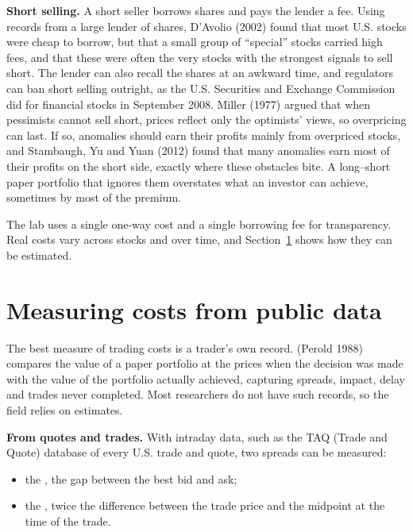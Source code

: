 \textbf{Short selling.} A short seller borrows shares and pays the lender a fee. Using records from a large lender of shares, D'Avolio (2002) found that most U.S. stocks were cheap to borrow, but that a small group of ``special'' stocks carried high fees, and that these were often the very stocks with the strongest signals to sell short. The lender can also recall the shares at an awkward time, and regulators can ban short selling outright, as the U.S. Securities and Exchange Commission did for financial stocks in September 2008. Miller (1977) argued that when pessimists cannot sell short, prices reflect only the optimists' views, so overpricing can last. If so, anomalies should earn their profits mainly from overpriced stocks, and Stambaugh, Yu and Yuan (2012) found that many anomalies earn most of their profits on the short side, exactly where these obstacles bite. A long--short paper portfolio that ignores them overstates what an investor can achieve, sometimes by most of the premium.

The lab uses a single one-way cost and a single borrowing fee for transparency. Real costs vary across stocks and over time, and Section~\ref{sec:17-measuring} shows how they can be estimated.


\section{Measuring costs from public data}
\label{sec:17-measuring}

The best measure of trading costs is a trader's own record.  (Perold 1988) compares the value of a paper portfolio at the prices when the decision was made with the value of the portfolio actually achieved, capturing spreads, impact, delay and trades never completed. Most researchers do not have such records, so the field relies on estimates.

\textbf{From quotes and trades.} With intraday data, such as the TAQ (Trade and Quote) database of every U.S. trade and quote, two spreads can be measured:

\begin{itemize}
  \item the , the gap between the best bid and ask;
  \item the , twice the difference between the trade price and the midpoint at the time of the trade.
\end{itemize}


